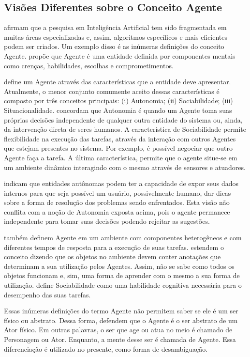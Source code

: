 \subsection{Visões Diferentes sobre o Conceito Agente} \label{sec:aopca}

\citet{laird2001human} afirmam que a pesquisa em Inteligência Artificial tem
sido fragmentada em muitas áreas especializadas e, assim, algoritmos
específicos e mais eficientes podem ser criados. Um exemplo disso é as
inúmeras definições do conceito Agente. \citet{shoham1993agent}
propõe que Agente é uma entidade definida por componentes mentais como
crenças, habilidades, escolhas e comprometimentos.

\citet{franklin1997agent} define um Agente através das características que a
entidade deve apresentar.  Atualmente, o menor conjunto comumente aceito
dessas características é composto por três conceitos principais: (i)
Autonomia; (ii) Sociabilidade; (iii) Situacionalidade.
\citet{roadmap,fatemeh2009multi} concordam que Autonomia é quando um Agente
toma suas próprias decisões independente de qualquer outra entidade do sistema
ou, ainda, da intervenção direta de seres humanos. A característica de
Sociabilidade permite flexibilidade na execução das tarefas, através da
interação com outros Agentes que estejam presentes no sistema. Por exemplo, é
possível negociar que outro Agente faça a tarefa. A última característica,
permite que o agente situe-se em um ambiente dinâmico interagindo com o mesmo
através de sensores e atuadores.

\citet{ingrand1992architecture} indicam que entidades autônomas podem ter a
capacidade de expor seus dados internos para que seja possível um usuário,
possivelmente humano, dar dicas sobre a forma de resolução dos problemas sendo
enfrentados. Esta visão não conflita com a noção de Autonomia exposta acima,
pois o agente permanece independente para tomar suas decisões podendo rejeitar
as sugestões.

 também definem Agente em um ambiente com
componentes heterogêneos e com diferentes tempos de resposta para a execução
de suas tarefas. \citet{doyle1998annotated} estendem o conceito dizendo que os
objetos no ambiente devem conter anotações que determinam a sua utilização
pelos Agentes. Assim, não se sabe como todos os objetos funcionam e, sim, uma
forma de aprender com o mesmo a sua forma de utilização.
\citet{shoham1993agent} define Sociabilidade como uma habilidade cognitiva
necessária para o desempenho das suas tarefas.

Essas inúmeras definições do termo Agente não permitem saber se ele é um ser
físico ou abstrato. Dessa forma, \citet{nareyek2001review,damiano2008emotions}
defendem que o Agente é o ser abstrato de um Ator físico. Em outras palavras,
o ser que age ou atua no meio é chamado de Personagem ou Ator. Enquanto, a
mente desse ser é chamada de Agente. Essa diferenciação é utilizado no
presente, como forma de desambiguação.
